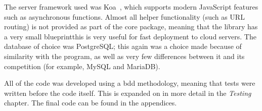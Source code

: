 The server framework used was Koa~\cite{koa}, which supports modern
JavaScript features such as asynchronous functions. Almost all helper
functionality (such as URL routing) is not provided as part of the core
package, meaning that the library has a very small blueprint\textemdash{}this
is very useful for fast deployment to cloud servers. The database of choice
was PostgreSQL; this again was a choice made because of similarity with the
program, as well as very few differences between it and its competition (for
example, MySQL and MariaDB).

All of the code was developed using a \acrfull{bdd} methodology, meaning that
tests were written before the code itself. This is expanded on in more detail
in the \textit{Testing} chapter. The final code can be found in the appendices.